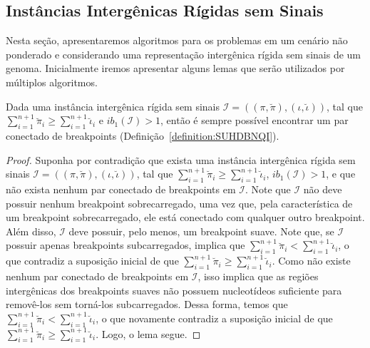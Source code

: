 \subsection{Instâncias Intergênicas Rígidas sem Sinais}

Nesta seção, apresentaremos algoritmos para os problemas em um cenário não ponderado e considerando uma representação intergênica rígida sem sinais de um genoma. Inicialmente iremos apresentar alguns lemas que serão utilizados por múltiplos algoritmos. 

\begin{lemma}\label{lemma:WYEZMYTM}
Dada uma instância intergênica rígida sem sinais $\mathcal{I}=((\pi,\breve\pi),(\iota,\breve\iota))$, tal que $\sum_{i=1}^{n+1}\breve\pi_i \ge \sum_{i=1}^{n+1}\breve\iota_i$ e $ib_1(\mathcal{I}) > 1$, então é sempre possível encontrar um par conectado de breakpoints (Definição~\ref{definition:SUHDBNQI}).
\end{lemma}
\begin{proof}
Suponha por contradição que exista uma instância intergênica rígida sem sinais $\mathcal{I}=((\pi,\breve\pi),(\iota,\breve\iota))$, tal que $\sum_{i=1}^{n+1}\breve\pi_i \ge \sum_{i=1}^{n+1}\breve\iota_i$, $ib_1(\mathcal{I}) > 1$, e que não exista nenhum par conectado de breakpoints em $\mathcal{I}$. Note que $\mathcal{I}$ não deve possuir nenhum breakpoint sobrecarregado, uma vez que, pela característica de um breakpoint sobrecarregado, ele está conectado com qualquer outro breakpoint. Além disso, $\mathcal{I}$ deve possuir, pelo menos, um breakpoint suave. Note que, se $\mathcal{I}$ possuir apenas breakpoints subcarregados, implica que $\sum_{i=1}^{n+1}\breve\pi_i < \sum_{i=1}^{n+1}\breve\iota_i$, o que contradiz a suposição inicial de que $\sum_{i=1}^{n+1}\breve\pi_i \ge \sum_{i=1}^{n+1}\breve\iota_i$. Como não existe nenhum par conectado de breakpoints em $\mathcal{I}$, isso implica que as regiões intergênicas dos breakpoints suaves não possuem nucleotídeos suficiente para removê-los sem torná-los subcarregados. Dessa forma, temos que $\sum_{i=1}^{n+1}\breve\pi_i < \sum_{i=1}^{n+1}\breve\iota_i$, o que novamente contradiz a suposição inicial de que $\sum_{i=1}^{n+1}\breve\pi_i \ge \sum_{i=1}^{n+1}\breve\iota_i$. Logo, o lema segue.
\end{proof}

